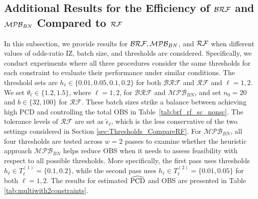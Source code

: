\documentclass[11pt]{article}
\begin{document}
\subsection{Additional Results for the Efficiency of ${\cal BRF}$ and ${\cal MPB}_{BN}$ Compared to ${\cal RF}$}
\label{sec:ComparingBeRFandRF}

In this subsection, we provide results for ${\cal BRF}, {\cal MPB}_{BN}$, and ${\cal RF}$ when different values of odds-ratio IZ, batch size, and thresholds are considered. 
Specifically, we conduct experiments where all three procedures consider the same thresholds for each constraint to evaluate their performance under similar conditions. The threshold sets are $h_{\ell} \in \{0.01, 0.05, 0.1, 0.2\}$ for both $\mathcal{BRF}$ and $\mathcal{RF}$ and $\ell=1,2$. We set $\theta_\ell\in \{1.2, 1.5\}$, where $\ell=1,2$, for $\mathcal{BRF}$ and $\mathcal{MPB}_{BN}$, and set $n_0=20$ and $b\in \{32, 100\}$ for $\mathcal{RF}$. These batch sizes strike a balance between achieving high PCD and controlling the total OBS in Table~\ref{tab:brf_rf_sc_nonsc}. The tolerance levels of $\mathcal{RF}$ are set as $\tilde{\epsilon}_\ell$, which is the less conservative of the two settings considered in Section \ref{sec:Thresholds_CompareRF}.
For $\mathcal{MPB}_{BN}$, all four thresholds are tested across $w=2$ passes to examine whether the heuristic approach $\mathcal{MPB}_{BN}$ helps reduce OBS when it needs to assess feasibility with respect to all possible thresholds. More specifically, the first pass uses thresholds $h_{\ell} \in T_\ell^{(1)}= \{0.1, 0.2\}$, while the second pass uses $h_{\ell} \in T_\ell^{(2)}= \{0.01, 0.05\}$ for both $\ell=1,2$. The results for estimated $\widehat{{\rm PCD}}$ and OBS are presented in Table \ref{tab:multiwith2constraints}.
\end{document}
